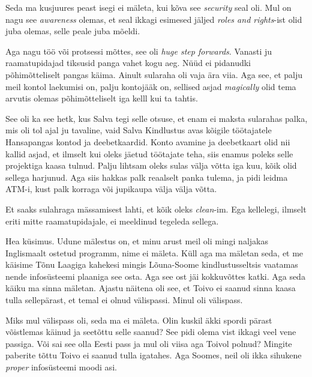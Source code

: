 
Seda ma kusjuures peast isegi ei mäleta, kui kõva see \emph{security} seal oli. Mul on nagu see \emph{awareness} olemas, et seal ikkagi esimesed jäljed \emph{roles and rights}-ist olid juba olemas, selle peale juba mõeldi. 

Aga nagu töö või protsessi mõttes, see oli \emph{huge step forwards}. Vanasti ju raamatupidajad tiksusid panga vahet kogu aeg. Nüüd ei pidanudki põhimõtteliselt pangas käima. Ainult  sularaha oli vaja ära viia. Aga see, et palju meil kontol laekumisi on, palju kontojääk on, sellised asjad \emph{magically} olid tema arvutis olemas põhimõtteliselt iga kelll kui ta  tahtis. 

See oli ka see hetk, kus Salva tegi selle otsuse, et enam ei maksta sularahas palka, mis oli tol ajal ju tavaline, vaid Salva Kindlustus avas kõigile töötajatele Hansapangas kontod ja deebetkaardid. Konto avamine ja deebetkaart olid nii kallid asjad, et ilmselt kui oleks jäetud  töötajate teha, siis enamus poleks selle projektiga kaasa tulnud. Palju lihtsam oleks sulas välja võtta iga kuu, kõik olid sellega harjunud. Aga siis hakkas palk reaalselt panka tulema, ja pidi leidma ATM-i, kust palk korraga või jupikaupa välja välja võtta. 


Et saaks sulahraga mässamisest lahti, et kõik oleks \emph{clean}-im. Ega kellelegi, ilmselt eriti mitte raamatupidajale, ei meeldinud tegeleda sellega. 


Hea küsimus. Udune mälestus on, et minu arust meil oli mingi naljakas Inglismaalt ostetud programm, nime ei mäleta. Küll aga ma mäletan seda, et me käisime  Tõnu Laagiga kahekesi mingis Lõuna-Soome kindlustusseltsis vaatamas nende infosüsteemi plaaniga see osta. Aga see ost jäi kokkuvõttes katki. Aga seda käiku ma sinna mäletan. Ajastu näitena oli see, et Toivo ei saanud sinna kaasa tulla sellepärast, et temal ei olnud välispassi. Minul oli välispass.


Miks mul välispass oli, seda ma ei mäleta. Olin kuskil äkki spordi pärast võistlemas käinud ja seetõttu selle saanud? See pidi olema vist ikkagi veel vene passiga. Või sai see olla Eesti pass ja mul oli viisa aga Toivol polnud? Mingite paberite tõttu Toivo ei saanud tulla igatahes. Aga Soomes, neil  oli ikka sihukene \emph{proper} infosüsteemi moodi asi. 

